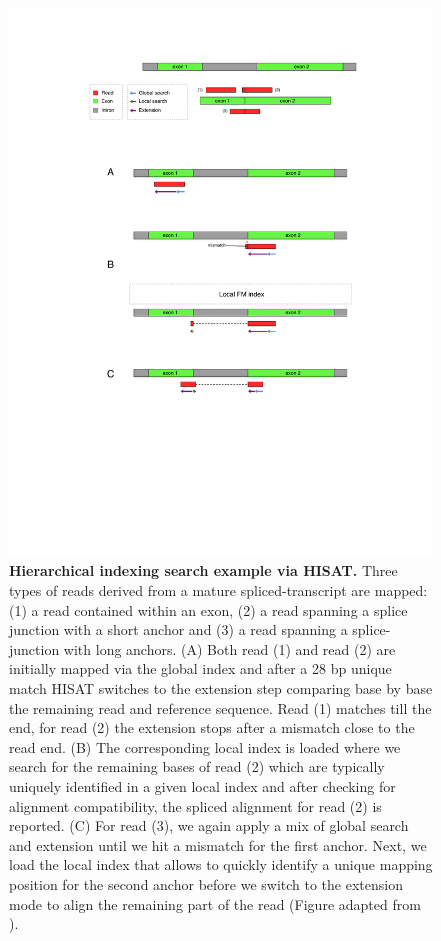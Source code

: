 \begin{figure}[h]
	 \centering
	 \includegraphics[width=1\linewidth]{img/chapter1/hisat}
	  \caption[Hierarchical indexing search example via HISAT]{\textbf{Hierarchical indexing search example via HISAT.} Three types of reads derived from a mature spliced-transcript are mapped: (1) a read contained within an exon, (2) a read spanning a splice junction with a short anchor and (3) a read spanning a splice-junction with long anchors. (A) Both read (1) and read (2) are initially mapped via the global index and after a 28 bp unique match HISAT switches to the extension step comparing base by base the remaining read and reference sequence. Read (1) matches till the end, for read (2) the extension stops after a mismatch close to the read end. (B) The corresponding local index is loaded where we search for the remaining bases of read (2) which are typically uniquely identified in a given local index and after checking for alignment compatibility, the spliced alignment for read (2) is reported. (C) For read (3), we again apply a mix of global search and extension until we hit a mismatch for the first anchor. Next, we load the local index that allows to quickly identify a unique mapping position for the second anchor before we switch to the extension mode to align the remaining part of the read (Figure adapted from \citeauthor{Kim2015} \citep{Kim2015}).}
	 \label{fig:hisat}
\end{figure}


